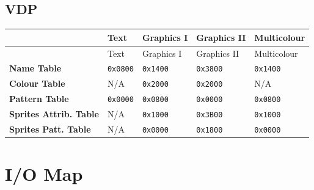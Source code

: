 \documentclass[a4paper,11pt]{article}
\begin{document}
    \subsection{VDP}

    \begin{longtable}{ |m{2.9cm}|m{1.6cm}|m{1.8cm}|m{1.9cm}|m{1.9cm}| }
        \hline
        \rowcolor{lightgray}
        & Text & Graphics I & Graphics II & Multicolour\\
        \hline
        \endfirsthead

        \hline
        \rowcolor{lightgray}
        & Text & Graphics I & Graphics II & Multicolour\\
        \hline
        \endhead

        \textbf{Name Table} & \texttt{0x0800} & \texttt{0x1400} & 
        \texttt{0x3800} & \texttt{0x1400}\\
        \hline
        \textbf{Colour Table} & N/A & \texttt{0x2000} & \texttt{0x2000} & N/A\\
        \hline
        \textbf{Pattern Table} & \texttt{0x0000} & \texttt{0x0800} &
        \texttt{0x0000} & \texttt{0x0800}\\
        \hline
        \textbf{Sprites Attrib. Table} & N/A & \texttt{0x1000} & \texttt{0x3B00}
        & \texttt{0x1000}\\
        \hline
        \textbf{Sprites Patt. Table} & N/A & \texttt{0x0000} & \texttt{0x1800} &
        \texttt{0x0000}\\
        \hline
    \end{longtable}

    \pagebreak
    \section{I/O Map}
\end{document}
